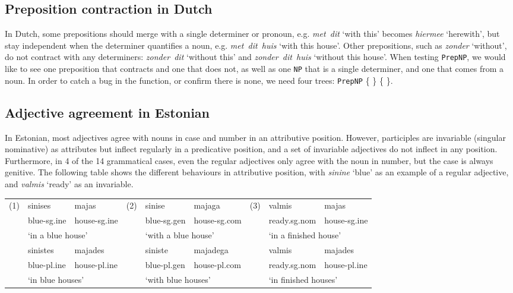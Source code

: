 \documentclass[11pt]{article}
\def\t#1{\texttt{#1}}
\begin{document}
\subsection{Preposition contraction in Dutch} In Dutch, some prepositions should
merge with a single determiner or pronoun, e.g. \emph{met~dit} `with
this' becomes \emph{hiermee} `herewith', but stay independent when the
determiner quantifies a noun, e.g. \emph{met~dit~huis} `with this house'. 
Other prepositions, such as \emph{zonder} `without', do not
contract with any determiners: \emph{zonder~dit} `without this' and
\emph{zonder~dit~huis} `without this house'.
When testing \t{PrepNP}, we would like to see one preposition that
contracts and one that does not, as well as one \t{NP} that is a
single determiner, and one that comes from a noun. In order to catch a
bug in the function, or confirm there is none, we need four trees:
\t{PrepNP} \{  \} 
           \{  \}. 

\subsection{Adjective agreement in Estonian} In Estonian,
most adjectives agree with nouns in case and number in an attributive
position. However, participles are invariable (singular nominative) as 
attributes but inflect regularly in a predicative position, and a set
of invariable adjectives do not inflect in any position. Furthermore,
in 4 of the 14 grammatical cases, even the regular adjectives only
agree with the noun in number, but the case is always genitive.
The following table shows the different behaviours in attributive
position, with \emph{sinine} `blue' as an example of a regular
adjective, and \emph{valmis} `ready' as an invariable.

\begin{table}[h]
\small
\begin{tabular}{cllcllcll}
(1) & sinises & majas & (2) & sinise & majaga & (3) & valmis & majas \\
& blue-{\sc sg.ine} & house-{\sc sg.ine} &  & blue-{\sc sg.gen} & house-{\sc sg.com} &  & ready.{\sc sg.nom} & house-{\sc sg.ine} \\
& \multicolumn{2}{l}{`in a blue house'} &  & \multicolumn{2}{l}{`with a blue house'} &  & \multicolumn{2}{l}{`in a finished house'} \\
& sinistes & majades &  & siniste & majadega &  & valmis & majades \\
& blue-{\sc pl.ine} & house-{\sc pl.ine} &  & blue-{\sc pl.gen} & house-{\sc pl.com} &  & ready.{\sc sg.nom} & house-{\sc pl.ine} \\
& \multicolumn{2}{l}{`in blue houses'} &  & \multicolumn{2}{l}{`with blue
                                         houses'} &  &
                                                     \multicolumn{2}{l}{`in finished houses'}

\end{tabular}
\end{table}
\end{document}
